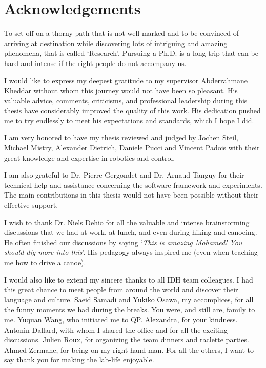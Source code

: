 \thispagestyle{empty}

\chapter*{Acknowledgements}

To set off on a thorny path that is not well marked and to be convinced of arriving at destination while discovering lots of intriguing and amazing phenomena, that is called ‘Research’. Pursuing a Ph.D. is a long trip that can be hard and intense if the right people do not accompany us. 

I would like to express my deepest gratitude to my supervisor Abderrahmane Kheddar without whom this journey would not have been so pleasant. His valuable advice, comments, criticisms, and professional leadership during this thesis have considerably improved the quality of this work. His dedication pushed me to try endlessly to meet his expectations and standards, which I hope I did. 

I am very honored to have my thesis reviewed and judged by Jochen Steil, Michael Mistry, Alexander Dietrich, Daniele Pucci and Vincent Padois with their great knowledge and expertise in robotics and control. 

I am also grateful to Dr. Pierre Gergondet and Dr. Arnaud Tanguy for their technical help and assistance concerning the software framework and experiments. The main contributions in this thesis would not have been possible without their effective support.

I wish to thank Dr. Niels Dehio for all the valuable and intense brainstorming discussions that we had at work, at lunch, and even during hiking and canoeing. He often finished our discussions by saying ‘\emph{This is amazing Mohamed!  You should dig more into this}’. His pedagogy always inspired me (even when teaching me how to drive a canoe).  %

I would also like to extend my sincere thanks to all IDH team colleagues. I had this great chance to meet people from around the world and discover their language and culture.  Saeid Samadi and Yukiko Osawa, my accomplices, for all the funny moments we had during the breaks. You were, and still are, family to me. Yuquan Wang, who initiated me to QP. Alexandra, for your kindness. Antonin Dallard, with whom I shared the office and for all the exciting discussions. Julien Roux, for organizing the team dinners and raclette parties. Ahmed Zermane, for being on my right-hand man. For all the others, I want to say thank you for making the lab-life enjoyable. 


